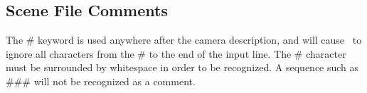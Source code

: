 \subsection{Scene File Comments}
The {\bf $\#$} keyword is used anywhere after the camera description, and 
will cause \RAY\ to ignore all characters from the {\bf $\#$} to the end 
of the input line.  The {\bf $\#$} character must be surrounded by whitespace
in order to be recognized.  A sequence such as {\bf $\#\#\#$} will not be
recognized as a comment.










